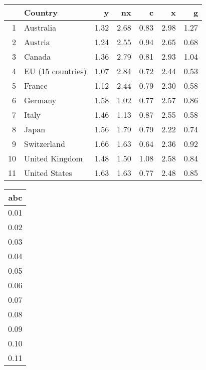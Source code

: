 \documentclass{article}
\begin{document}
\begin{table}[ht]
\centering
\begin{tabular}{rlrrrrr}
  \hline
  & Country & y & nx & c & x & g \\ 
  \hline
  1 & Australia & 1.32 & 2.68 & 0.83 & 2.98 & 1.27 \\ 
  2 & Austria & 1.24 & 2.55 & 0.94 & 2.65 & 0.68 \\ 
  3 & Canada & 1.36 & 2.79 & 0.81 & 2.93 & 1.04 \\ 
  4 & EU (15 countries) & 1.07 & 2.84 & 0.72 & 2.44 & 0.53 \\ 
  5 & France & 1.12 & 2.44 & 0.79 & 2.30 & 0.58 \\ 
  6 & Germany & 1.58 & 1.02 & 0.77 & 2.57 & 0.86 \\ 
  7 & Italy & 1.46 & 1.13 & 0.87 & 2.55 & 0.58 \\ 
  8 & Japan & 1.56 & 1.79 & 0.79 & 2.22 & 0.74 \\ 
  9 & Switzerland & 1.66 & 1.63 & 0.64 & 2.36 & 0.92 \\ 
  10 & United Kingdom & 1.48 & 1.50 & 1.08 & 2.58 & 0.84 \\ 
  11 & United States & 1.63 & 1.63 & 0.77 & 2.48 & 0.85 \\ 
  \hline
  \end{tabular}%
\begin{tabular}{r}
\hline
abc\\
\hline
0.01 \\ 0.02 \\ 0.03 \\ 0.04 \\ 0.05 \\ 0.06 \\
0.07 \\ 0.08 \\ 0.09 \\ 0.10 \\ 0.11 \\
\hline
\end{tabular}
\end{table}
\end{document}
